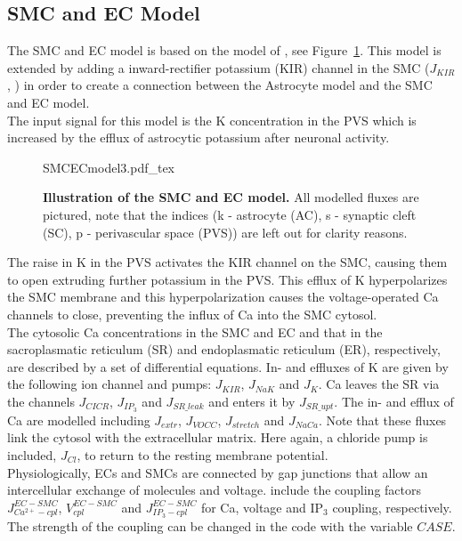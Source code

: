 \subsection{SMC and EC Model}
The SMC and EC model is based on the model of \citet{Koenigsberger2006}, see Figure~\ref{fig:SMCECmodel}. This model is extended by adding a inward-rectifier potassium (KIR) channel in the SMC ($ J_{KIR} $, \cite{Filosa2004}) in order to create a connection between the Astrocyte model and the SMC and EC model. \\%
The input signal for this model is the \gls{K} concentration in the PVS which is increased by the efflux of astrocytic potassium after neuronal activity. 
\begin{figure}[h!]
  \centering
  \def\svgwidth{450pt} %
  \scriptsize
  {SMCECmodel3.pdf_tex}
  \caption{\textbf{Illustration of the SMC and EC model.} All modelled fluxes are pictured, note that the indices (k - astrocyte (AC), s - synaptic cleft (SC), p - perivascular space (PVS)) are left out for clarity reasons.}
\label{fig:SMCECmodel}
\end{figure}
The raise in \gls{K} in the PVS activates the KIR channel on the SMC, causing them to open extruding further potassium in the PVS. This efflux of \gls{K} hyperpolarizes the SMC membrane and this hyperpolarization causes the voltage-operated \gls{Ca} channels to close, preventing the influx of \gls{Ca} into the SMC cytosol.\\
The cytosolic \gls{Ca} concentrations in the SMC and EC and that in the sacroplasmatic reticulum (SR) and endoplasmatic reticulum (ER), respectively, are described by a set of differential equations. In- and effluxes  of \gls{K} are given by the following ion channel and pumps: $ J_{KIR} $, $ J_{NaK} $ and $ J_{K} $. \gls{Ca} leaves the SR via the channels $ J_{CICR} $, $ J_{IP_3} $ and $ J_{SR\_leak} $ and enters it by $ J_{SR\_upt} $. The in- and efflux of \gls{Ca} are modelled including $ J_{extr} $, $ J_{VOCC} $, $ J_{stretch} $ and $ J_{NaCa} $. Note that these fluxes link the cytosol with the extracellular matrix. Here again, a chloride pump is included, $ J_{Cl} $, to return to the resting membrane potential.\\
Physiologically, ECs and SMCs are connected by gap junctions that allow an intercellular exchange of molecules and voltage.  \citet{Koenigsberger2006} include the coupling factors $J_{Ca^{2+}-cpl}^{EC-SMC}$, $V_{cpl}^{EC-SMC}$ and $J_{IP_{3}-cpl}^{EC-SMC}$ for \gls{Ca}, voltage and IP$ _3 $ coupling, respectively. The strength of the coupling can be changed in the code with the variable $ CASE $.\\
